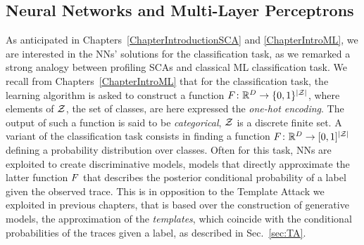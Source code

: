 \subsection{Neural Networks and Multi-Layer Perceptrons}
As anticipated in Chapters~\ref{ChapterIntroductionSCA} and \ref{ChapterIntroML}, we are interested in the NNs' solutions for the classification task, as we remarked a strong analogy between profiling SCAs and classical ML classification task. We recall from Chapters~\ref{ChapterIntroML} that for the classification task, the learning algorithm is asked to construct a function $F\colon \mathbb{R}^D \rightarrow \{0,1\}^{\lvert\mathcal{Z}\rvert}$, where elements of $\mathcal{Z}$, \ie the set of classes, are here expressed \via the \emph{one-hot encoding}. The output of such a function is said to be \emph{categorical}, \ie $\mathcal{Z}$ is a discrete finite set. A variant of the classification task consists in finding a function $F\colon \mathbb{R}^D \rightarrow [0,1]^{\lvert\mathcal{Z}\rvert}$ defining a probability distribution over classes. Often for this task, NNs are exploited to create discriminative models, \ie models that directly approximate the latter function $F$ that describes the posterior conditional probability of a label given the observed trace. This is in opposition to the Template Attack we exploited in previous chapters, that is based over the construction of generative models, \ie the approximation of the \emph{templates}, which coincide with the conditional probabilities of the traces given a label, as described in Sec.~\ref{sec:TA}. \\

